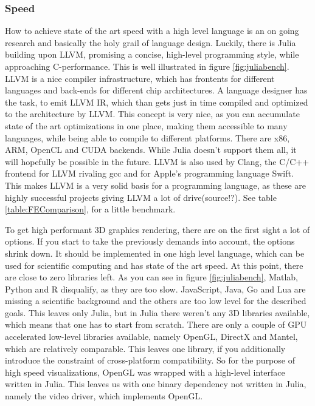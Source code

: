 \subsubsection{Speed}

How to achieve state of the art speed with a high level language is an on going research and basically the holy grail of language design.
Luckily, there is Julia building upon \ac{LLVM}, promising a concise, high-level programming style, while approaching C-performance. 
This is well illustrated in figure \ref{fig:juliabench}.
\ac{LLVM} is a nice compiler infrastructure, which has frontents for different languages and back-ends for different chip architectures. 
A language designer has the task, to emit \ac{LLVM} \ac{IR}, which than gets just in time compiled and optimized to the architecture by \ac{LLVM}.
This concept is very nice, as you can accumulate state of the art optimizations in one place, making them accessible to many languages, while being able to compile to different platforms. There are x86, ARM, OpenCL and CUDA backends. While Julia doesn't support them all, it will hopefully be possible in the future. 
\ac{LLVM} is also used by Clang, the C/C++ frontend for \ac{LLVM} rivaling gcc and for Apple's programming language Swift. 
This makes \ac{LLVM} is a very solid basis for a programming language, as these are highly successful projects giving  \ac{LLVM} a lot of drive(source!?).
See table \ref{table:FEComparison}, for a little benchmark.

To get high performant 3D graphics rendering, there are on the first sight a lot of options.
If you start to take the previously demands into account, the options shrink down.
It should be implemented in one high level language, which can be used for scientific computing and has state of the art speed. At this point, there are close to zero libraries left. As you can see in figure \ref{fig:juliabench}, Matlab, Python and R disqualify, as they are too slow. JavaScript, Java, Go and Lua are missing a scientific background and the others are too low level for the described goals.
This leaves only Julia, but in Julia there weren't any 3D libraries available, which means that one has to start from scratch.
There are only a couple of GPU accelerated low-level libraries available, namely OpenGL, DirectX and Mantel, which are relatively comparable. This leaves one library, if you additionally introduce the constraint of cross-platform compatibility.
So for the purpose of high speed visualizations, OpenGL was wrapped with a high-level interface written in Julia. This leaves us with one binary dependency not written in Julia, namely the video driver, which implements OpenGL.

